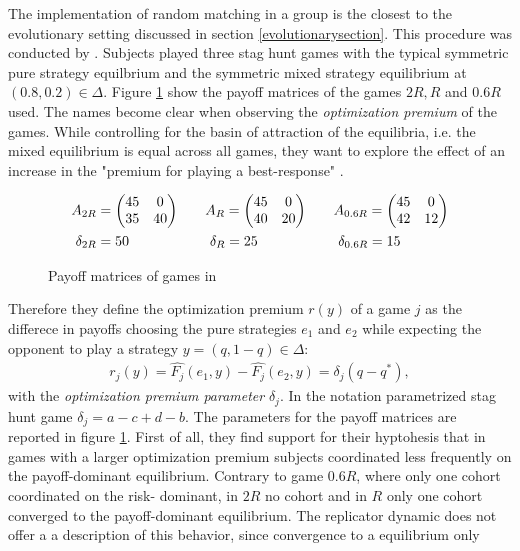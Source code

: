 \documentclass[12pt]{article}
\begin{document}
The implementation of random matching in a group is the closest to the 
evolutionary setting discussed in section \ref{evolutionarysection}. This 
procedure was conducted by \textcite{battalio_optimization_2001}. Subjects 
played three stag hunt games with the typical symmetric pure strategy
equilbrium and the symmetric mixed strategy equilibrium at $(0.8,0.2) \in
\Delta$. Figure \ref{fig:payoffbattalio} show the payoff matrices of the
games $2R, R$ and $0.6R$ used. The names become clear when observing the 
\textit{optimization premium} of the games. While controlling for the basin of 
attraction of the equilibria, i.e. the mixed equilibrium is equal across all games,
they want to explore the effect of an increase in the "premium for playing
a best-response" \parencite[751]{battalio_optimization_2001}. 
\begin{figure}[h]
        \label{fig:payoffbattalio}
\caption{Payoff matrices of games in \textcite{battalio_optimization_2001}}
\begin{alignat*}{3}
        A_{2R} &= \mqty(45 & 0 \\ 35 & 40) \quad & &A_{R} = \mqty(45 & 0 \\ 
        40 & 20) \quad & &A_{0.6R} = \mqty( 45 & 0 \\ 42 & 12) \\
        \delta_{2R} &= 50  \quad & &\ \delta_{R} = 25 \quad & &\ \delta_{0.6R} = 15
\end{alignat*}
\end{figure}
Therefore they define the optimization premium $r(y)$ of a game $j$ as the 
differece in payoffs choosing the pure strategies $e_1$ and $e_2$ 
while expecting the opponent to play a strategy $y=(q,1-q) \in \Delta$:
\begin{align}
        r_j(y)= \hat{F_j}(e_1,y) - \hat{F_j}(e_2,y) = \delta_j(q-q^*),
\end{align}
with the \textit{optimization premium parameter} $\delta_j$. In the notation
parametrized stag hunt game $\delta_j = a - c + d - b$.
The parameters for the payoff matrices are reported in figure \ref{fig:payoffbattalio}. 
First of all, they find support for their hyptohesis that in games with a 
larger optimization premium subjects coordinated less frequently on the 
payoff-dominant equilibrium. 
Contrary to game $0.6R$, where only one cohort coordinated on the risk-
dominant, in $2R$ no cohort and in $R$ only one cohort converged to the 
payoff-dominant equilibrium. The replicator dynamic does not offer a
a description of this behavior, since convergence to a equilibrium only 
\end{document}
